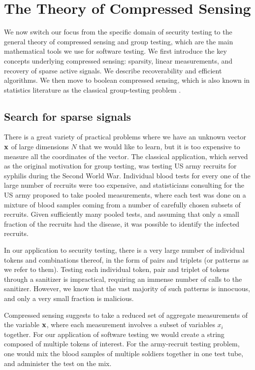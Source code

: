 \section{The Theory of Compressed Sensing}

We now switch our focus from the specific domain of security testing to the general theory of compressed sensing and group testing, which are the main mathematical tools we use for software testing. We first introduce the key concepts underlying compressed sensing: sparsity, linear measurements, and recovery of sparse active signals. We describe recoverability and efficient algorithms. We then move to boolean compressed sensing, which is also known in statistics literature as the classical group-testing problem \cite{dorfman1943detection, group_testing}. 


\subsection{Search for sparse signals}

There is a great variety of practical problems where we have an unknown vector $\mathbf{x}$
of large dimensions $N$ that we would like to learn, but it is too expensive to measure all
the coordinates of the vector. The classical application, which served as the original motivation
for group testing, was testing US army recruits for syphilis during the Second World War. 
Individual blood tests for every one of the large number of recruits were too expensive, 
and statisticians consulting for the US army proposed to take pooled measurements, where 
each test was done on a mixture of blood samples coming from a number of carefully chosen subsets of recruits. Given sufficiently many pooled tests, and assuming that only a small fraction of the recruits had the disease, it was possible to identify the infected recruits.  

In our application to security testing, there is a very large number of individual tokens and
combinations thereof, in the form of pairs and triplets (or patterns as we refer to them). Testing each individual token, pair and 
triplet of tokens through a sanitizer is impractical, requiring an immense number of calls to the 
sanitizer. However, we know that the vast majority of such patterns is innocuous, 
and only a very small fraction is malicious. 

Compressed sensing suggests to take a reduced set of aggregate measurements of the variable $\mathbf{x}$,
where each measurement involves a subset of variables $x_i$ together.  For our application of
software testing we would create a string composed of multiple tokens of interest.  For the
army-recruit testing problem, one would mix the blood samples of multiple soldiers together
in one test tube, and administer the test on the mix.


